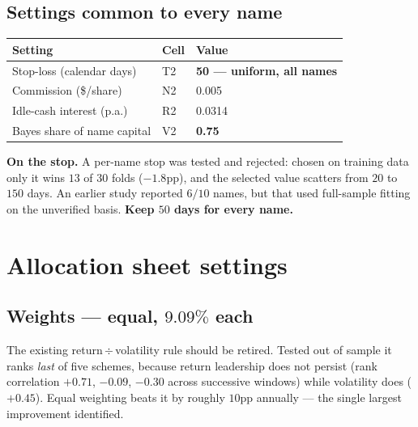 \documentclass[11pt]{article}
\begin{document}
\subsection{Settings common to every name}

\begin{table}[H]\centering\small
\renewcommand{\arraystretch}{1.15}
\begin{tabular}{l l l}
\toprule
\textbf{Setting} & \textbf{Cell} & \textbf{Value}\\
\midrule
\rowcolor{bcact} Stop-loss (calendar days) & T2 & \textbf{50 --- uniform, all names}\\
Commission (\$/share) & N2 & 0.005\\
Idle-cash interest (p.a.) & R2 & 0.0314\\
Bayes share of name capital & V2 & \textbf{0.75}\\
\bottomrule
\end{tabular}
\end{table}

\textbf{On the stop.} A per-name stop was tested and rejected: chosen on training data only it
wins $13$ of $30$ folds ($-1.8$pp), and the selected value scatters from $20$ to $150$ days.
An earlier study reported $6/10$ names, but that used full-sample fitting on the unverified
basis. \textbf{Keep $50$ days for every name.}

\section{Allocation sheet settings}

\subsection{Weights --- equal, $9.09\%$ each}

The existing return\,$\div$\,volatility rule should be retired. Tested out of sample it ranks
\emph{last} of five schemes, because return leadership does not persist (rank correlation
$+0.71$, $-0.09$, $-0.30$ across successive windows) while volatility does ($+0.45$). Equal
weighting beats it by roughly $10$pp annually --- the single largest improvement identified.
\end{document}
